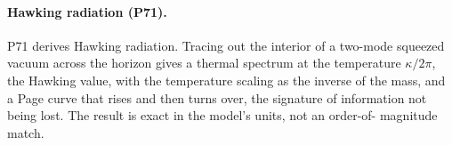 \paragraph{Hawking radiation (P71).}
P71 derives Hawking radiation. Tracing out the interior of a two-mode squeezed vacuum across the
horizon gives a thermal spectrum at the temperature $\kappa/2\pi$, the Hawking value, with the
temperature scaling as the inverse of the mass, and a Page curve that rises and then turns over, the
signature of information not being lost. The result is exact in the model's units, not an order-of-
magnitude match.
